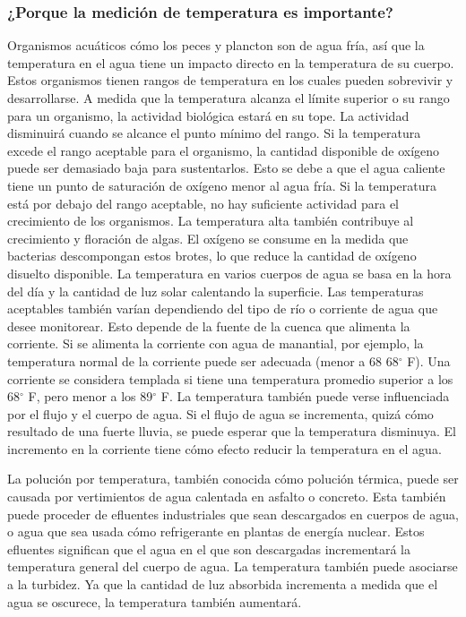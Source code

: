 \subsubsection{¿Porque la medición de temperatura es importante?}
Organismos acuáticos cómo los peces y plancton son de agua fría, así que la temperatura en el agua tiene un impacto directo en la temperatura de su cuerpo. 
Estos organismos tienen rangos de temperatura en los cuales pueden sobrevivir y desarrollarse. 
A medida que la temperatura alcanza el límite superior o su rango para un organismo, la actividad biológica estará en su tope. 
La actividad disminuirá cuando se alcance el punto mínimo del rango. 
Si la temperatura excede el rango aceptable para el organismo, la cantidad disponible de oxígeno puede ser demasiado baja para sustentarlos. 
Esto se debe a que el agua caliente tiene un punto de saturación de ox\'igeno menor al agua fría. 
Si la temperatura está por debajo del rango aceptable, no hay suficiente actividad para el crecimiento de los organismos. 
La temperatura alta también contribuye al crecimiento y floración de algas. 
El oxígeno se consume en la medida que bacterias descompongan estos brotes, lo que reduce la cantidad de oxígeno disuelto disponible.
La temperatura en varios cuerpos de agua se basa en la hora del día y la cantidad de luz solar calentando la superficie. 
Las temperaturas aceptables también varían dependiendo del tipo de río o corriente de agua que desee monitorear. 
Esto depende de la fuente de la cuenca que alimenta la corriente. 
Si se alimenta la corriente con agua de manantial, por ejemplo, la temperatura normal de la corriente puede ser adecuada (menor a 68 68$^\circ$ F). 
Una corriente se considera templada si tiene una temperatura promedio superior a los 68$^\circ$ F, pero menor a los 89$^\circ$ F. 
La temperatura también puede verse influenciada por el flujo y el cuerpo de agua. 
Si el flujo de agua se incrementa, quizá cómo resultado de una fuerte lluvia, se puede esperar que la temperatura disminuya. 
El incremento en la corriente tiene cómo efecto reducir la temperatura en el agua.

La polución por temperatura, también conocida cómo polución térmica, puede ser causada por vertimientos de agua calentada en asfalto o concreto. 
Esta también puede proceder de efluentes industriales que sean descargados en cuerpos de agua, o agua que sea usada cómo refrigerante en plantas de energía nuclear. 
Estos efluentes significan que el agua en el que son descargadas incrementará la temperatura general del cuerpo de agua.  
La temperatura también puede asociarse a la turbidez.  
Ya que la cantidad de luz absorbida incrementa a medida que el agua se oscurece, la temperatura también aumentará.

